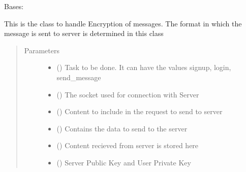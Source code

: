 \documentclass[letterpaper,10pt,english]{sphinxmanual}
\begin{document}
\begin{fulllineitems}
\label{\detokenize{Message:Message.Message}}
Bases: 

This is the class to handle Encryption of messages. The format in which the message is sent to server is determined in this class
\begin{quote}\begin{description}
\item[{Parameters}] \leavevmode\begin{itemize}
\item {} 
 () \textendash{} Task to be done. It can have the values signup, login, send\_message

\item {} 
 () \textendash{} The socket used for connection with Server

\item {} 
 () \textendash{} Content to include in the request to send to server

\item {} 
 () \textendash{} Contains the data to send to the server

\item {} 
 () \textendash{} Content recieved from server is stored here

\item {} 
 () \textendash{} Server Public Key and User Private Key

\end{itemize}

\end{description}\end{quote}


\end{fulllineitems}
\end{document}
